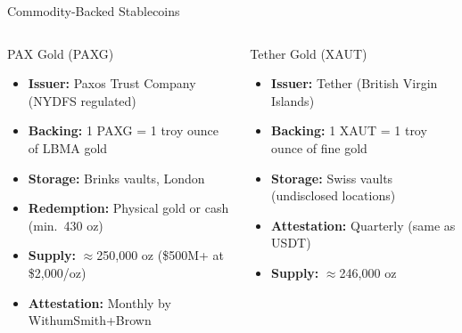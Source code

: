 \documentclass[8pt,aspectratio=169]{beamer}
\begin{document}
\begin{frame}{Commodity-Backed Stablecoins}
\begin{columns}[T]
\begin{block}{PAX Gold (PAXG)}
\begin{itemize}\setlength{\itemsep}{2pt}
  \item \textbf{Issuer:} Paxos Trust Company (NYDFS regulated)
  \item \textbf{Backing:} 1 PAXG = 1 troy ounce of LBMA gold
  \item \textbf{Storage:} Brinks vaults, London
  \item \textbf{Redemption:} Physical gold or cash (min.\ 430 oz)
  \item \textbf{Supply:} $\approx$250{,}000 oz (\$500M+ at \$2{,}000/oz)
  \item \textbf{Attestation:} Monthly by WithumSmith+Brown
\end{itemize}
\end{block}
\vspace{2mm}
\begin{block}{Tether Gold (XAUT)}
\begin{itemize}\setlength{\itemsep}{2pt}
  \item \textbf{Issuer:} Tether (British Virgin Islands)
  \item \textbf{Backing:} 1 XAUT = 1 troy ounce of fine gold
  \item \textbf{Storage:} Swiss vaults (undisclosed locations)
  \item \textbf{Attestation:} Quarterly (same as USDT)
  \item \textbf{Supply:} $\approx$246{,}000 oz
\end{itemize}
\end{block}
\end{columns}
\end{frame}
\end{document}
